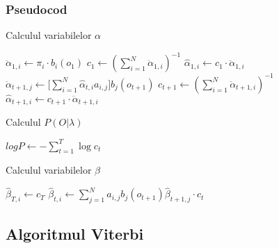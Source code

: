 \documentclass[12pt]{article}
\begin{document}
\subsubsection{Pseudocod}
\label{sec:pseudocod-fb}

\begin{algorithm}[H]
  \caption{Calculul variabilelor $\alpha$}
  \label{alg1:alpha}
  \begin{algorithmic}[1]
     \STATE $\ddot{\alpha}_{1,i} \leftarrow
    \pi_i \cdot b_i(o_1)$
    \ENDFOR
    \STATE $c_1 \leftarrow (\displaystyle\sum_{i=1}^{N}
    \ddot{\alpha}_{1,i})^{-1}$  \STATE
    $\hat{\alpha}_{1,i} \leftarrow c_1 \cdot \ddot{\alpha}_{1,i}$
    \ENDFOR
      \STATE
    $\ddot{\alpha}_{t+1,j} \leftarrow \Big[
    \displaystyle\sum_{i=1}^{N}\hat{\alpha}_{t,i}a_{i,j}\Big]
    b_{j}(o_{t+1})$
    \ENDFOR
    \STATE $c_{t+1} \leftarrow (\displaystyle\sum_{i=1}^{N}
    \ddot{\alpha}_{t+1,i})^{-1}$  \STATE
    $\hat{\alpha}_{t+1,i} \leftarrow c_{t+1} \cdot
    \ddot{\alpha}_{t+1,i}$
    \ENDFOR
    \ENDFOR
  \end{algorithmic}
\end{algorithm}

\begin{algorithm}[H]
  \caption{Calculul $P(O \vert \lambda)$}
  \label{alg2:logP}
  \begin{algorithmic}[1]
    \STATE $logP \leftarrow -\displaystyle\sum_{t=1}^{T}\log{c_t}$
  \end{algorithmic}
\end{algorithm}

\begin{algorithm}[H]
  \caption{Calculul variabilelor $\beta$}
  \label{alg3:beta}
  \begin{algorithmic}[1]
     \STATE $\hat{\beta}_{T,i} \leftarrow
    c_T$
    \ENDFOR
      \STATE
    $\hat{\beta}_{t,i} \leftarrow \displaystyle\sum_{j=1}^{N}
    a_{i,j} b_{j}(o_{t+1}) \hat{\beta}_{t+1,j} \cdot c_t$
    \ENDFOR
    \ENDFOR
  \end{algorithmic}
\end{algorithm}


\subsection{Algoritmul Viterbi}
\label{sec:viterbi}
\end{document}
